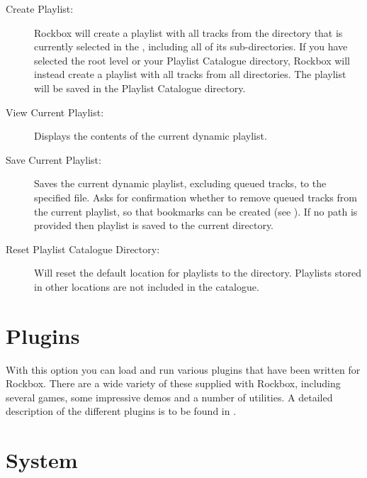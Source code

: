 \begin{description}
\item[Create Playlist:]
  Rockbox will create a playlist with all tracks from the directory that is
currently selected in the , including
all of its sub-directories. If you have selected the root level or your Playlist Catalogue directory,
Rockbox will instead create a playlist with all tracks from all directories. The playlist
will be saved in the Playlist Catalogue directory.

\item[View Current Playlist:]
  Displays the contents of the current dynamic playlist.

\item[Save Current Playlist:]
  Saves the current dynamic playlist, excluding queued tracks, to the
specified file. Asks for confirmation whether to remove queued tracks
from the current playlist, so that bookmarks can be created
(see ).
If no path is provided then playlist is saved to the current directory.

\item[Reset Playlist Catalogue Directory:]
  Will reset the default location for playlists to the 
directory. Playlists stored in other locations are not included in the catalogue.

\end{description}

\section{Plugins}
  With this option you can load and run various plugins that have been
written for Rockbox. There are a wide variety of these supplied with
Rockbox, including several games, some impressive demos and a number of
utilities. A detailed description of the different plugins is to be found in
.

\section{\label{ref:Info}System}

